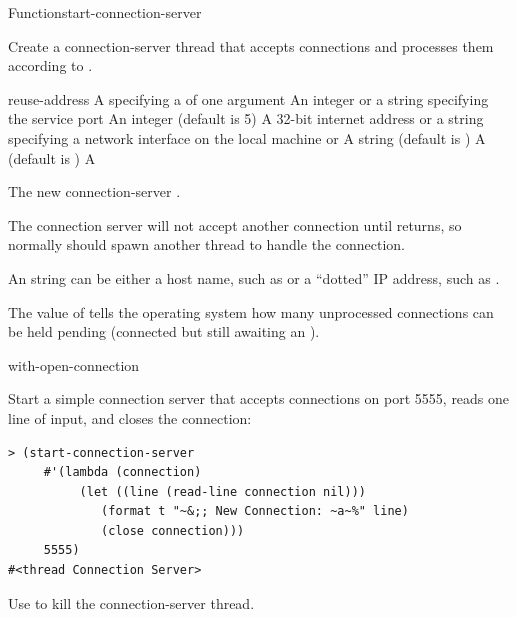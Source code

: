 \documentclass[10pt,twoside,english,pdftex]{article}
\begin{document}
\begin{functiondoc}{Function}{start-connection-server}%
  {
     
    \returns{} }
%
%
%
%

\fnsyntax

\fnpurpose Create a connection-server thread that accepts connections
and processes them according to .

\fnpackage {}

\fnmodule {}

\fnargs
\begin{args}{reuse-address}
\arg[function] A  specifying a 
   of one argument
\arg[port] An integer or a string specifying the service port
\arg[backlog] An integer (default is 5)
\arg[interface] A 32-bit internet address or a string specifying a network 
interface on the local machine or \nil 
\arg[name] A string (default is )
 A  (default is \nil)
\arg[thread] A 
\end{args}

\fnreturns The new connection-server .

\fnerrors
\nothreads{}

%
\fndescription The connection server will not accept another
connection until  returns, so normally
 should spawn another thread to handle the
connection.  

An  string can be either a host name, such as
 or a ``dotted'' IP address, such as .

The value of  tells the operating system
how many unprocessed connections can be held pending (connected but
still awaiting an \textbf{}).

\begin{alsos}{with-open-connection}
\end{alsos}

\fnexample
Start a simple connection server that accepts connections on port
5555, reads one line of input, and closes the connection:
%
\W\supp
\begin{verbatim}
> (start-connection-server
     #'(lambda (connection)
          (let ((line (read-line connection nil)))
             (format t "~&;; New Connection: ~a~%" line)
             (close connection)))
     5555)
#<thread Connection Server>
\end{verbatim}

%
\fnnote
Use \textbf{} to kill the connection-server thread.

\end{functiondoc}
\end{document}
